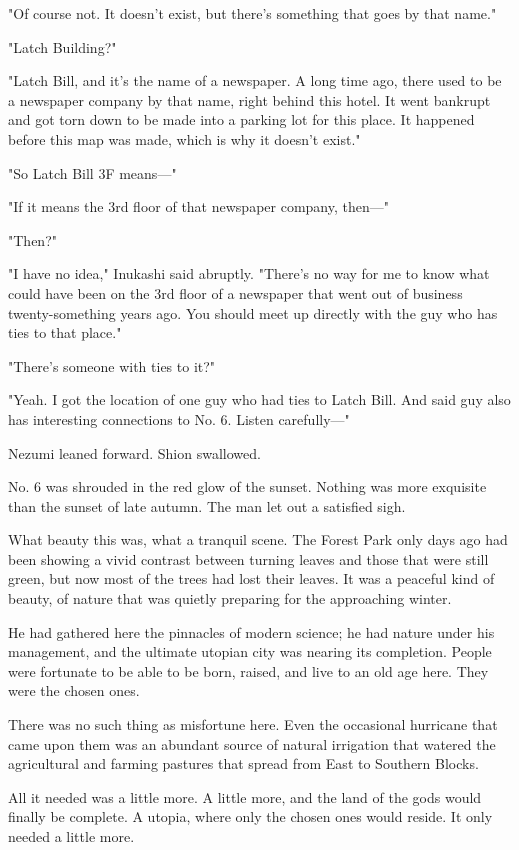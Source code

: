 "Of course not. It doesn't exist, but there's something that goes by
that name."

"Latch Building?"

"Latch Bill, and it's the name of a newspaper. A long time ago, there
used to be a newspaper company by that name, right behind this hotel. It
went bankrupt and got torn down to be made into a parking lot for this
place. It happened before this map was made, which is why it doesn't
exist."

"So Latch Bill 3F means---"

"If it means the 3rd floor of that newspaper company, then---"

"Then?"

"I have no idea," Inukashi said abruptly. "There's no way for me to know
what could have been on the 3rd floor of a newspaper that went out of
business twenty-something years ago. You should meet up directly with
the guy who has ties to that place."

"There's someone with ties to it?"

"Yeah. I got the location of one guy who had ties to Latch Bill. And
said guy also has interesting connections to No. 6. Listen carefully---"

Nezumi leaned forward. Shion swallowed.

\mybreak

No. 6 was shrouded in the red glow of the sunset. Nothing was more
exquisite than the sunset of late autumn. The man let out a satisfied
sigh.

What beauty this was, what a tranquil scene. The Forest Park only days
ago had been showing a vivid contrast between turning leaves and those
that were still green, but now most of the trees had lost their leaves.
It was a peaceful kind of beauty, of nature that was quietly preparing
for the approaching winter.

He had gathered here the pinnacles of modern science; he had nature
under his management, and the ultimate utopian city was nearing its
completion. People were fortunate to be able to be born, raised, and
live to an old age here. They were the chosen ones.

There was no such thing as misfortune here. Even the occasional
hurricane that came upon them was an abundant source of natural
irrigation that watered the agricultural and farming pastures that
spread from East to Southern Blocks.

All it needed was a little more. A little more, and the land of the gods
would finally be complete. A utopia, where only the chosen ones would
reside. It only needed a little more.

